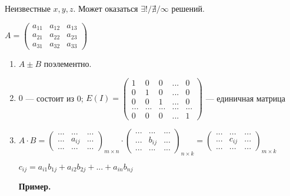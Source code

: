 \documentclass{article}
\begin{document}
    Неизвестные \( x, y, z \). Может оказаться \(\exists!/ \nexists/ \infty\) решений.

    \( A =
        \begin{pmatrix}
            a_{11} & a_{12} & a_{13}\\
            a_{21} & a_{22} & a_{23}\\
            a_{31} & a_{32} & a_{33}
        \end{pmatrix}
    \)

    \begin{enumerate}
        \item \( A \pm B \) поэлементно.
        \item \( 0 \) --- состоит из 0; \( E(I) = \begin{pmatrix}
            1 & 0 & 0 & ... & 0\\
            0 & 1 & 0 & ... & 0\\
            0 & 0 & 1 & ... & 0\\
            ... & ... & ... & ... & ...\\
            0 & 0 & 0 & ... & 1
        \end{pmatrix} \) --- единичная матрица
        \item \(A\cdot B = \begin{pmatrix}
            ... & ... & ...\\
            ... & a_{ij} & ...\\
            ... & ... & ...
        \end{pmatrix}_{m \times n}
        \cdot \begin{pmatrix}
            ... & ... & ...\\
            ... & b_{ij} & ...\\
            ... & ... & ...
        \end{pmatrix}_{n \times k} = 
        \begin{pmatrix}
            ... & ... & ...\\
            ... & c_{ij} & ...\\
            ... & ... & ...
        \end{pmatrix}_{m \times k}\)

        \(c_{ij} = a_{i1}b_{1j} + a_{i2}b_{2j} + ... + a_{in}b_{nj}\)

        \textbf{Пример.}


\end{enumerate}
\end{document}

